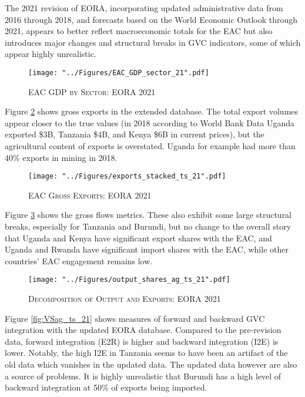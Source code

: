 \documentclass[a4paper]{article}
\begin{document}
The 2021 revision of EORA, incorporating updated administrative data from 2016 through 2018, and forecasts based on the World Economic Outlook through 2021, appears to better reflect macroeconomic totals for the EAC but also introduces major changes and structural breaks in GVC indicators, some of which appear highly unrealistic. 

\begin{figure}[h!]
\centering
\caption{\label{fig:EAC_GDP_sec_21}\textsc{EAC GDP by Sector: EORA 2021}}
\texttt{[image: "../Figures/EAC\_GDP\_sector\_21".pdf]} %
\end{figure}
\FloatBarrier

Figure \ref{fig:exp21} shows gross exports in the extended database. The total export volumes appear closer to the true values (in 2018 according to World Bank Data Uganda exported \$3B, Tanzania \$4B, and Kenya \$6B in current prices), but the agricultural content of exports is overstated. Uganda for example had more than 40\% exports in mining in 2018. 

\begin{figure}[h!]
\centering
\caption{\label{fig:exp21}\textsc{EAC Gross Exports: EORA 2021}}
\texttt{[image: "../Figures/exports\_stacked\_ts\_21".pdf]} %
\end{figure}
\FloatBarrier

Figure \ref{fig:outshares_ag_ts_21} shows the gross flows metrics. These also exhibit some large structural breaks, especially for Tanzania and Burundi, but no change to the overall story that Uganda and Kenya have significant export shares with the EAC, and Uganda and Rwanda have significant import shares with the EAC, while other countries' EAC engagement remains low. 

\begin{figure}[h!] %
\centering
\caption{\label{fig:outshares_ag_ts_21}\textsc{Decomposition of Output and Exports: EORA 2021}}
\texttt{[image: "../Figures/output\_shares\_ag\_ts\_21".pdf]} %
\vspace{-15mm}
\end{figure}
\FloatBarrier

Figure \ref{fig:VSag_ts_21} shows measures of forward and backward GVC integration with the updated EORA database. Compared to the pre-revision data, forward integration (E2R) is higher and backward integration (I2E) is lower. Notably, the high I2E in Tanzania seems to have been an artifact of the old data which vanishes in the updated data. The updated data however are also a source of problems. It is highly unrealistic that Burundi has a high level of backward integration at 50\% of exports being imported. 
\end{document}
